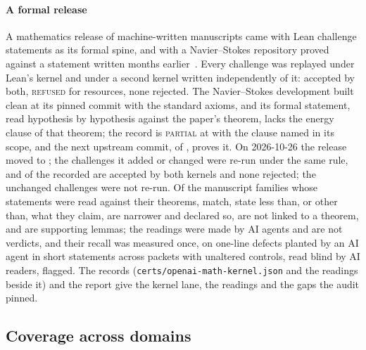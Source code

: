 \documentclass[preprint,11pt,a4paper]{elsarticle}
\theoremstyle{definition}
\newcommand{\verdict}[1]{\textup{\textsc{#1}}}
\newcommand{\REFS}{\verdict{refused}}
\begin{document}
\paragraph{A formal release}
A mathematics release of \MtOaManuscripts{} machine-written manuscripts came with \MtOaChallenges{} Lean challenge statements as its formal spine, and with a Navier--Stokes repository proved against a statement written months earlier~\citep{OpenAIMath,OpenAINS}. Every challenge was replayed under Lean's kernel and under a second kernel written independently of it: \MtOaCertified{} accepted by both, \MtOaRefused{} \REFS{} for resources, none rejected. The Navier--Stokes development built clean at its pinned commit with the standard axioms, and its formal statement, read hypothesis by hypothesis against the paper's theorem, lacks the energy clause of that theorem; the record is \verdict{partial} at \NsCommit{} with the clause named in its scope, and the next upstream commit, \NsHeadCommit{} of \NsHeadDate, proves it. On 2026-10-26 the release moved to \MtOaTwoPin; the \MtOaTwoMembers{} challenges it added or changed were re-run under the same rule, and of the \MtOaTwoDecided{} recorded \MtOaTwoCertified{} are accepted by both kernels\MtOaTwoRefusedNote{} and none rejected\MtOaTwoOpenNote; the \MtOaTwoUnchanged{} unchanged challenges were not re-run. Of the \MtOaStatements{} manuscript families whose statements were read against their theorems, \MtOaMatches{} match, \MtOaShort{} state less than, or other than, what they claim, \MtOaNarrowerDeclared{} are narrower and declared so, \MtOaUnlinked{} are not linked to a theorem, and \MtOaSupportOnly{} are supporting lemmas; the readings were made by AI agents and are not verdicts, and their recall was measured once, on \MtRrPlants{} one-line defects planted by an AI agent in short statements across \MtRrPackets{} packets with \MtRrControls{} unaltered controls, read blind by AI readers, \MtRrFlagged{} flagged. The records (\texttt{certs/openai-math-kernel.json} and the readings beside it) and the report give the kernel lane, the readings and the \MtOaGaps{} gaps the audit pinned.

\subsection{Coverage across domains}\label{sec:coverage}
\end{document}
